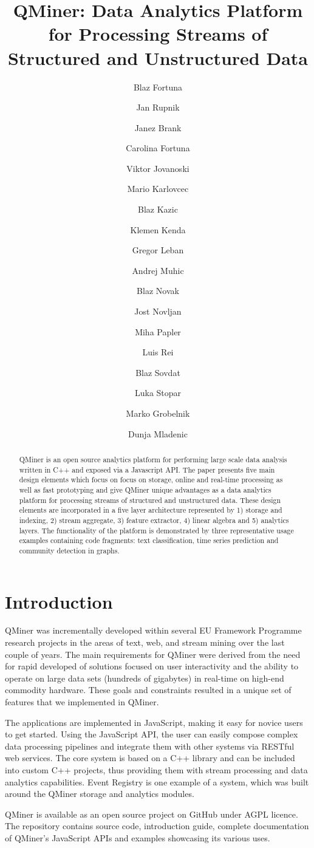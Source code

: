 \documentclass{article} %
\title{QMiner: Data Analytics Platform for Processing Streams of Structured and Unstructured Data}
\author[1,3]{\rm Blaz Fortuna}
\author[1]{\rm Jan Rupnik}
\author[1]{\rm Janez Brank}
\author[2,3]{\rm Carolina Fortuna}
\author[1]{\rm Viktor Jovanoski}
\author[1]{\rm Mario Karlovcec}
\author[1]{\rm Blaz Kazic}
\author[1]{\rm Klemen Kenda}
\author[1]{\rm Gregor Leban}
\author[1]{\rm Andrej Muhic}
\author[1]{\rm Blaz Novak}
\author[2]{\rm Jost Novljan}
\author[1]{\rm Miha Papler}
\author[1]{\rm Luis Rei}
\author[1]{\rm Blaz Sovdat}
\author[1]{\rm Luka Stopar}
\author[1]{\rm Marko Grobelnik}
\author[1]{\rm Dunja Mladenic}
\affil[1]{Artificial Intelligence Laboratory, Jozef Stefan Institute, Jamova 39, Ljubljana, Slovenia.}
\affil[2]{Department of Communication Systems, Jozef Stefan Institute, Jamova 39, Ljubljana, Slovenia.}
\affil[3]{Internet Based Communication Networks and Services, University of Gent, Gaston Crommerlaan 8, Gent, Belgium.}
\affil[ ]{\textit {\{firstname.lastname\}@ijs.si}}
\begin{document}
\maketitle

\begin{abstract}
QMiner is an open source analytics platform for performing large scale data analysis written in C++ and exposed via a Javascript API. The paper presents five main design elements which focus on focus on storage, online and real-time processing as well as fast prototyping and give QMiner unique advantages as a data analytics platform for processing streams of structured and unstructured data. These design elements are incorporated in a five layer architecture represented by  1) storage and indexing, 2) stream aggregate, 3) feature extractor, 4) linear algebra and 5) analytics layers. The functionality of the platform is demonstrated by three representative usage examples containing code fragments: text classification, time series prediction and community detection in graphs.\end{abstract}

\section{Introduction}
QMiner was incrementally developed within several EU Framework Programme research projects in the areas of text, web, and stream mining over the last couple of years. The main requirements for QMiner were derived from the need for rapid developed of solutions focused on user interactivity and the ability to operate on large data sets (hundreds of gigabytes) in real-time on high-end commodity hardware. These goals and constraints resulted in a unique set of features that we implemented in QMiner.

The applications are implemented in JavaScript, making it easy for novice users to get started. Using the JavaScript API, the user can easily compose complex data processing pipelines and integrate them with other systems via RESTful web services. The core system is based on a C++ library and can be included into custom C++ projects, thus providing them with stream processing and data analytics capabilities. Event Registry\cite{eventRegistry} is one example of a system, which was built around the QMiner storage and analytics modules.

QMiner is available as an open source project on GitHub under AGPL licence. The repository contains source code, introduction guide, complete documentation of QMiner's JavaScript APIs and examples showcasing its various uses.
\end{document}

